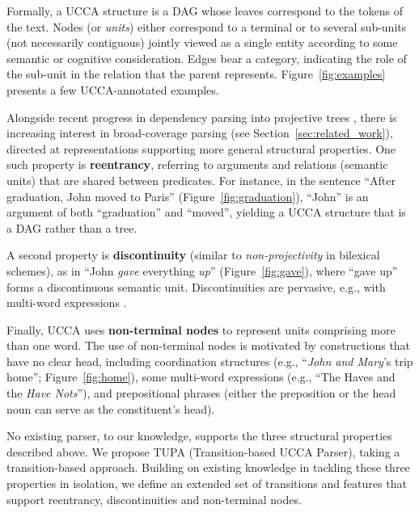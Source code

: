 \documentclass[11pt,a4paper]{article}
\newcommand{\parser}[1]{TUPA\textsubscript{#1}}
\newcommand{\secref}[1]{Section~\ref{#1}}
\newcommand{\figref}[1]{Figure~\ref{#1}}
\begin{document}
Formally, a UCCA structure is a DAG
whose leaves correspond to the tokens of
the text. Nodes (or {\it units}) either correspond to a terminal or
to several sub-units (not necessarily contiguous) jointly viewed as a
single entity according to some semantic or cognitive consideration.
Edges bear a category, indicating the role of the sub-unit in the relation
that the parent represents. \figref{fig:examples} presents a few UCCA-annotated examples.

Alongside recent progress in dependency parsing into projective trees
\cite{dyer2015transition,andor2016globally,kiperwasser2016simple},
there is increasing interest in broad-coverage parsing
(see \secref{sec:related_work}),
directed at representations supporting more general structural properties.
One such property is \textbf{reentrancy},
referring to arguments and relations (semantic units) that are shared between predicates.
For instance, in the sentence
``After graduation, John moved to Paris'' (\figref{fig:graduation}),
``John'' is an argument of both ``graduation''
and ``moved'', yielding a UCCA structure that is a DAG rather than a tree.

A second property is \textbf{discontinuity} (similar to \textit{non-projectivity} in bilexical schemes), as in ``John \textit{gave} everything \textit{up}''
(\figref{fig:gave}), where ``gave up'' forms a discontinuous semantic unit.
Discontinuities are pervasive, e.g.,  with multi-word
expressions \cite{schneider2014discriminative}.

Finally, UCCA uses \textbf{non-terminal nodes}
to represent units comprising more than one word.
The use of non-terminal nodes is motivated by constructions that have no clear head, including
coordination structures (e.g., ``\textit{John and Mary}'s trip home''; \figref{fig:home}),
some multi-word expressions (e.g., ``The Haves and the \textit{Have Nots}''),
and prepositional phrases (either the preposition or the head noun can serve as the constituent's head).

No existing parser, to our knowledge, supports the three structural properties described above.
We propose \parser{} (Transition-based UCCA Parser), taking a transition-based approach.
Building on existing knowledge in tackling these three properties
in isolation, we define an extended set of transitions and features
that support reentrancy, discontinuities and non-terminal nodes.
\end{document}
